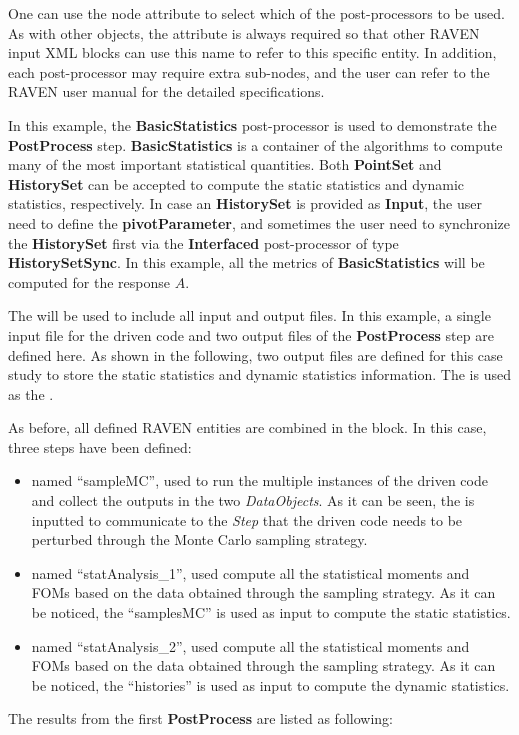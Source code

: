One can use the node attribute  to select which of the post-processors to be used. As with other
objects, the attribute  is always required so that other RAVEN input XML blocks can use this name
to refer to this specific entity. In addition, each post-processor may require extra sub-nodes, and the user can refer
to the RAVEN user manual for the detailed specifications.

In this example, the \textbf{BasicStatistics} post-processor is used to demonstrate the \textbf{PostProcess} step.
\textbf{BasicStatistics} is a container of the algorithms to compute many of the most important statistical quantities.
Both \textbf{PointSet} and \textbf{HistorySet} can be accepted to compute the static statistics and dynamic statistics,
respectively. In case an \textbf{HistorySet} is provided as \textbf{Input}, the user need to define the \textbf{pivotParameter},
and sometimes the user need to synchronize the \textbf{HistorySet} first via the \textbf{Interfaced} post-processor of
type \textbf{HistorySetSync}.
In this example, all the metrics of \textbf{BasicStatistics} will be computed for the response $A$.

The  will be used to include all input and output files. In this example, a single input file
for the driven code and two output files of the \textbf{PostProcess} step are defined here. As shown in the following,
two output files are defined for this case study to store the static statistics and dynamic statistics information.
The  is used as the .


As before, all defined RAVEN entities are combined in the  block.
In this case, three steps have been defined:

\begin{itemize}
  \item {} named ``sampleMC'', used to run the multiple instances of the driven code and
     collect the outputs in the two \textit{DataObjects}. As it can be seen, the  is inputted
     to communicate to the \textit{Step} that the driven code needs to be perturbed through the Monte Carlo sampling
     strategy.
  \item {} named ``statAnalysis\_1'', used compute all the statistical moments and FOMs
    based on the data obtained through the sampling strategy. As it can be noticed, the 
    ``samplesMC'' is used as input to compute the static statistics.
  \item {} named ``statAnalysis\_2'', used compute all the statistical moments and FOMs
    based on the data obtained through the sampling strategy. As it can be noticed, the 
    ``histories'' is used as input to compute the dynamic statistics.
\end{itemize}

The results from the first \textbf{PostProcess} are listed as following:
